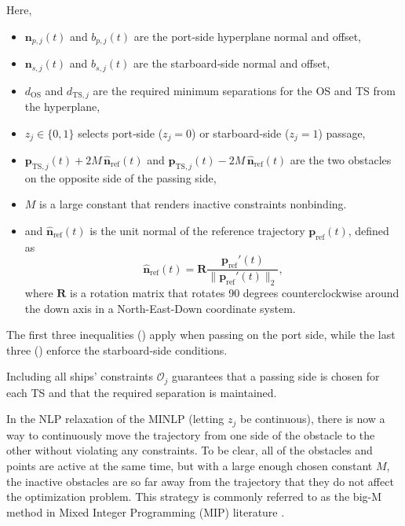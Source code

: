 Here,
\begin{itemize}
    \item $\mathbf{n}_{p,j}(t)$ and $b_{p,j}(t)$ are the port‐side hyperplane normal and offset,
    \item $\mathbf{n}_{s,j}(t)$ and $b_{s,j}(t)$ are the starboard‐side normal and offset,
    \item $d_{\text{OS}}$ and $d_{\text{TS},j}$ are the required minimum separations for the OS and TS from the hyperplane, 
    \item $z_j\in\{0,1\}$ selects port‐side ($z_j=0$) or starboard‐side ($z_j=1$) passage,
    \item $\mathbf{p}_{\mathrm{TS},j}(t)+2M\,\mathbf{\hat n}_{\mathrm{ref}}(t)$ and $\mathbf{p}_{\mathrm{TS},j}(t)-2M\,\mathbf{\hat n}_{\mathrm{ref}}(t)$ are the two obstacles on the opposite side of the passing side,
    \item $M$ is a large constant that renders inactive constraints nonbinding.
    \item and $\mathbf{\hat n}_{\mathrm{ref}}(t)$ is the unit normal of the reference trajectory $\mathbf p_\text{ref}(t)$, defined as
    \begin{equation}\label{eq:reference-normal}
        \mathbf{\hat n}_{\mathrm{ref}}(t) = \mathbf R\frac{\mathbf p_\text{ref}'(t)}{\|\mathbf p_\text{ref}'(t)\|_2},
    \end{equation}
    where $\mathbf R$ is a rotation matrix that rotates 90 degrees counterclockwise around the down axis in a North-East-Down coordinate system.
\end{itemize}
The first three inequalities
()
apply when passing on the port side, while the last three
()
enforce the starboard‐side conditions.


Including all ships’ constraints $\mathcal{O}_j$ guarantees that a passing side is chosen for each TS and that the required separation is maintained.
    
In the NLP relaxation of the MINLP (letting $z_j$ be continuous), there is now a way to continuously move the trajectory from one side of the obstacle to the other without violating any constraints. To be clear, all of the obstacles and points are active at the same time, but with a large enough chosen constant $M$, the inactive obstacles are so far away from the trajectory that they do not affect the optimization problem. This strategy is commonly referred to as the big-M method in Mixed Integer Programming (MIP) literature \citep{gan2012adaptive,Cococcioni2020}.

